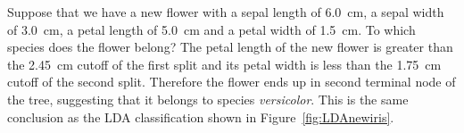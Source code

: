 Suppose that we have a new flower with a sepal length of 6.0~cm, a
sepal width of 3.0~cm, a petal length of 5.0~cm and a petal width of
1.5~cm. To which species does the flower belong? The petal length of
the new flower is greater than the 2.45~cm cutoff of the first split
and its petal width is less than the 1.75~cm cutoff of the second
split. Therefore the flower ends up in second terminal node of the
tree, suggesting that it belongs to species \emph{versicolor}.  This
is the same conclusion as the LDA classification shown in
Figure~\ref{fig:LDAnewiris}.


